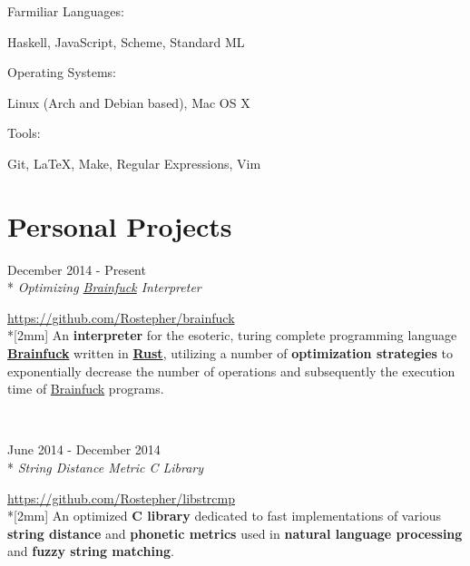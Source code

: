 \documentclass[a4paper,margin,line]{resume}
\newcommand{\rvspace}{2mm} %
\newcommand{\rurl}[1]{\hfill {\footnotesize \url{#1}}}
\newcommand{\rdate}[1]{\hfill {\small #1}}
\newcommand{\rdescription}[1]{\small #1 \normalsize}
\newcommand{\ritem}[5] {
    \item[#1]                               %
    \hfill \rdate{#2} \\*                   %
    \hfill {\small \emph{#3}}               %
    \strut \hfill \rurl{#4} \\*[\rvspace]   %
    \rdescription{#5}                       %
}
\newcommand{\rproject}{\ritem}
\begin{document}
\begin{resume}
\begin{compactdesc}
        \item[Farmiliar Languages:]
        \begin{asparablank} {\small
            \item Haskell, JavaScript, Scheme, Standard ML
        } \end{asparablank}

        \item[Operating Systems:]
        \begin{asparablank} {\small
            \item Linux (Arch and Debian based), Mac OS X
        } \end{asparablank}

		\item[Tools:]
        \begin{asparablank} { \small
            \item Git, \LaTeX, Make, Regular Expressions, Vim
		} \end{asparablank}
	\end{compactdesc}

\section{\mysidestyle Personal Projects}
    \begin{asparadesc}
        \rproject {brainfuck}
                  {December 2014 - Present}
                  {Optimizing \href{https://en.wikipedia.org/wiki/Brainfuck}
                                   {Brainfuck} Interpreter}
                  {https://github.com/Rostepher/brainfuck}
        {
            An {\bf interpreter} for the esoteric, turing complete programming
            language \href{https://en.wikipedia.org/wiki/Brainfuck}{\bf Brainfuck}
            written in \href{https://rust-lang.org}{\bf Rust}, utilizing a
            number of {\bf optimization strategies} to exponentially decrease
            the number of operations and subsequently the execution time of
            \href{https://en.wikipedia.org/wiki/Brainfuck}{Brainfuck} programs.
        }
        \\

        \rproject {libstrcmp}
                  {June 2014 - December 2014}
                  {String Distance Metric C Library}
                  {https://github.com/Rostepher/libstrcmp}
        {
            An optimized {\bf C library} dedicated to fast implementations of
            various {\bf string distance} and {\bf phonetic metrics} used
            in {\bf natural language processing} and {\bf fuzzy string matching}.
        }
        \\


\end{asparadesc}
\end{resume}
\end{document}
